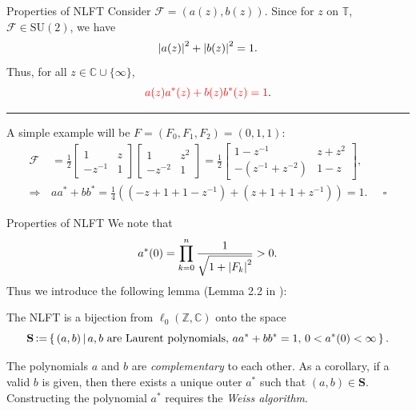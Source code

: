 \begin{frame}{Properties of NLFT}
    Consider $\mathcal{F} = (a(z),b(z))$. Since for $z$ on $\mathbb{T}$, $\mathcal{F}\in\mathrm{SU}(2)$, we have
    \begin{equation*}
        \left|{a(z)}\right|^2 + \left|{b(z)}\right|^2 = 1.
    \end{equation*}
    Thus, for all $z\in \mathbb{C}\cup\{\infty\}$,
    \begin{equation}
        {\color{red} a(z) a^*(z) + b(z) b^*(z) = 1}.
    \end{equation}
    \hrule
    A simple example will be $F = (F_0,F_1,F_2) = (0,1,1)$:
    \begin{align*}
        \mathcal{F} &= \frac{1}{2}\left[\begin{matrix}
            1 & z \\ -z^{-1} & 1
        \end{matrix}\right] \left[\begin{matrix}
            1 & z^2 \\ -z^{-2} & 1
        \end{matrix}\right] = \frac{1}{2} \left[\begin{matrix}
            1 - z^{-1} &  z + z^2 \\ -(z^{-1}+z^{-2}) & 1-z
        \end{matrix}\right], \\
        \Rightarrow\, & aa^* + bb^* = \frac{1}{4}\left((-z+1+1-z^{-1}) + (z+1+1+z^{-1})\right) = 1.\;\;\;\;\; \square
    \end{align*}
\end{frame}
\begin{frame}{Properties of NLFT}
    We note that
    \begin{align*}
        a^*(0) = \prod_{k=0}^{n} \frac{1}{\sqrt{1+\left|{F_k}\right|^2}} > 0.
    \end{align*}
    Thus we introduce the following lemma (Lemma 2.2 in \cite{Lin2025}):
    \begin{lemma}
        The NLFT is a bijection from $\ell_0(\mathbb{Z},\mathbb{C})$ onto the space
        \begin{equation}
            \mathbf{S} \operatorname{\vcentcolon=} \left\{\,{(a,b)}\,\middle\vert\,{a,b\text{ are Laurent polynomials, }aa^*+bb^*=1\text{, }0<a^*(0)<\infty}\,\right\}.
        \end{equation}
    \end{lemma}
    The polynomials $a$ and $b$ are \textit{complementary} to each other. As a corollary, if a valid $b$ is given, then there exists a {\color{red}unique outer} $a^*$ such that $(a,b)\in\mathbf{S}$. Constructing the polynomial $a^*$ requires the \textit{\color{blue}Weiss algorithm}.
\end{frame}
